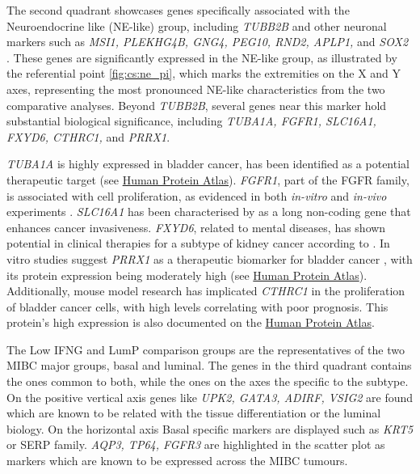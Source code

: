 The second quadrant showcases genes specifically associated with the Neuroendocrine like (NE-like) group, including \textit{TUBB2B} and other neuronal markers such as \textit{MSI1, PLEKHG4B, GNG4, PEG10, RND2, APLP1,} and \textit{SOX2} \citep{Robertson2017-mg}. These genes are significantly expressed in the NE-like group, as illustrated by the referential point \cref{fig:cs:ne_pi}, which marks the extremities on the X and Y axes, representing the most pronounced NE-like characteristics from the two comparative analyses. Beyond \textit{TUBB2B}, several genes near this marker hold substantial biological significance, including \textit{TUBA1A, FGFR1, SLC16A1, FXYD6, CTHRC1,} and \textit{PRRX1}.

\textit{TUBA1A} is highly expressed in bladder cancer, has been identified as a potential therapeutic target \citet{Zhang2019-fk} (see \href{https://www.proteinatlas.org/ENSG00000167552-TUBA1A/tissue}{Human Protein Atlas}). \textit{FGFR1}, part of the FGFR family, is associated with cell proliferation, as evidenced in both \textit{in-vitro} and \textit{in-vivo} experiments \citet{Tomlinson2009-td}. \textit{SLC16A1} has been characterised by \citet{Logotheti2020-ya} as a long non-coding gene that enhances cancer invasiveness. \textit{FXYD6}, related to mental diseases, has shown potential in clinical therapies for a subtype of kidney cancer according to \citet{Gao2014-sq}. In vitro studies suggest \textit{PRRX1} as a therapeutic biomarker for bladder cancer \citet{Huang2022-ez}, with its protein expression being moderately high (see \href{https://www.proteinatlas.org/ENSG00000116132-PRRX1/tissue}{Human Protein Atlas}). Additionally, mouse model research has implicated \textit{CTHRC1} in the proliferation of bladder cancer cells, with high levels correlating with poor prognosis. This protein's high expression is also documented on the \href{https://www.proteinatlas.org/ENSG00000164932-CTHRC1/tissue}{Human Protein Atlas}.

The Low IFNG and LumP comparison groups are the representatives of the two MIBC major groups, basal and luminal. The genes in the third quadrant contains the ones common to both, while the ones on the axes the specific to the subtype. On the positive vertical axis genes like \textit{UPK2, GATA3, ADIRF, VSIG2} are found which are known to be related with the tissue differentiation or the luminal biology. On the horizontal axis Basal specific markers are displayed such as \textit{KRT5} or SERP family. \textit{AQP3, TP64, FGFR3} are highlighted in the scatter plot as markers which are known to be expressed across the MIBC tumours.

